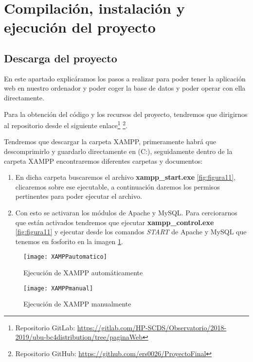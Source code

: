 \section{Compilación, instalación y ejecución del proyecto}\label{intalacionE}

\subsection{Descarga del proyecto}
En este apartado explicáramos los pasos a realizar para poder tener la aplicación web en nuestro ordenador y poder coger la base de datos y poder operar con ella directamente. 

Para la obtención del código \cite{GitLab} \cite{GitHub} y los recursos del proyecto, tendremos que dirigirnos al repositorio desde el siguiente enlace\footnote{Repositorio GitLab: \url{https://gitlab.com/HP-SCDS/Observatorio/2018-2019/ubu-bc4distribution/tree/paginaWeb}} \footnote{Repositorio GitHub: \url{https://github.com/ers0026/ProyectoFinal}}.

Tendremos que descargar la carpeta XAMPP, primeramente habrá que descomprimirlo y guardarlo directamente en (C:), seguidamente dentro de la carpeta XAMPP encontraremos diferentes carpetas y documentos:

\begin{enumerate}
	\item En dicha carpeta buscaremos el archivo \textbf{xampp\_start.exe} \ref{fig:figura11}, clicaremos sobre ese ejecutable, a continuación daremos los permisos pertinentes para poder ejecutar el archivo.
	\item Con esto se activaran los módulos de Apache y MySQL. Para cerciorarnos que están activados tendremos que ejecutar \textbf{xampp\_control.exe} \ref{fig:figura11} y ejecutar desde los comandos \textit{START} de Apache y MySQL que tenemos en fosforito en la imagen \ref{fig:figura12}.
\end{enumerate}

\begin{figure}[h!]
	\centering
	\begin{minipage}[b]{0.8\linewidth}
		\centering
		\texttt{[image: XAMPPautomatico]}
		\caption{Ejecución de XAMPP automáticamente}
		\label{fig:figura11}
	\end{minipage}
	\begin{minipage}[b]{0.8\linewidth}
		\centering
		\texttt{[image: XAMPPmanual]}
		\caption{Ejecución de XAMPP manualmente}
		\label{fig:figura12}
	\end{minipage}
\end{figure}



